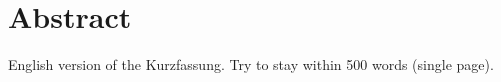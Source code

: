 
\chapter*{Abstract}
\label{ch:Abstract}
English version of the Kurzfassung. Try to stay within 500 words (single page).

